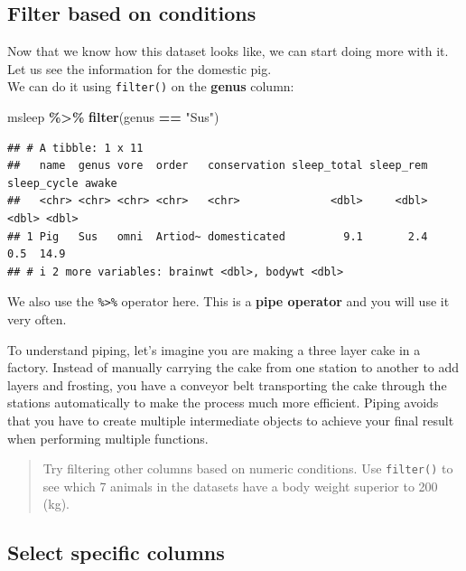 \documentclass[
]{book}
\newenvironment{Shaded}{\begin{snugshade}}{\end{snugshade}}
\newcommand{\FunctionTok}[1]{\textcolor[rgb]{0.13,0.29,0.53}{\textbf{#1}}}
\newcommand{\NormalTok}[1]{#1}
\newcommand{\SpecialCharTok}[1]{\textcolor[rgb]{0.81,0.36,0.00}{\textbf{#1}}}
\newcommand{\StringTok}[1]{\textcolor[rgb]{0.31,0.60,0.02}{#1}}
\begin{document}
\hypertarget{filter-based-on-conditions}{%
\subsection*{Filter based on conditions}\label{filter-based-on-conditions}}

Now that we know how this dataset looks like, we can start doing more with it.
Let us see the information for the domestic pig.\\
We can do it using \texttt{filter()} on the \textbf{genus} column:

\begin{Shaded}
\begin{Highlighting}[]
\NormalTok{msleep }\SpecialCharTok{\%\textgreater{}\%}
  \FunctionTok{filter}\NormalTok{(genus }\SpecialCharTok{==} \StringTok{"Sus"}\NormalTok{)}
\end{Highlighting}
\end{Shaded}

\begin{verbatim}
## # A tibble: 1 x 11
##   name  genus vore  order   conservation sleep_total sleep_rem sleep_cycle awake
##   <chr> <chr> <chr> <chr>   <chr>              <dbl>     <dbl>       <dbl> <dbl>
## 1 Pig   Sus   omni  Artiod~ domesticated         9.1       2.4         0.5  14.9
## # i 2 more variables: brainwt <dbl>, bodywt <dbl>
\end{verbatim}

We also use the \texttt{\%\textgreater{}\%} operator here.
This is a \textbf{pipe operator} and you will use it very often.

To understand piping, let's imagine you are making a three layer cake in a factory.
Instead of manually carrying the cake from one station to another to add layers and frosting, you have a conveyor belt transporting the cake through the stations automatically to make the process much more efficient.
Piping avoids that you have to create multiple intermediate objects to achieve your final result when performing multiple functions.

\begin{quote}
Try filtering other columns based on numeric conditions.
Use \texttt{filter()} to see which 7 animals in the datasets have a body weight superior to 200 (kg).
\end{quote}

\hypertarget{select-specific-columns}{%
\subsection*{Select specific columns}\label{select-specific-columns}}
\end{document}
